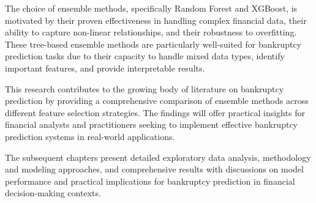 The choice of ensemble methods, specifically Random Forest and XGBoost, is motivated by their proven effectiveness in handling complex financial data, their ability to capture non-linear relationships, and their robustness to overfitting. These tree-based ensemble methods are particularly well-suited for bankruptcy prediction tasks due to their capacity to handle mixed data types, identify important features, and provide interpretable results.

This research contributes to the growing body of literature on bankruptcy prediction by providing a comprehensive comparison of ensemble methods across different feature selection strategies. The findings will offer practical insights for financial analysts and practitioners seeking to implement effective bankruptcy prediction systems in real-world applications.

The subsequent chapters present detailed exploratory data analysis, methodology and modeling approaches, and comprehensive results with discussions on model performance and practical implications for bankruptcy prediction in financial decision-making contexts. 